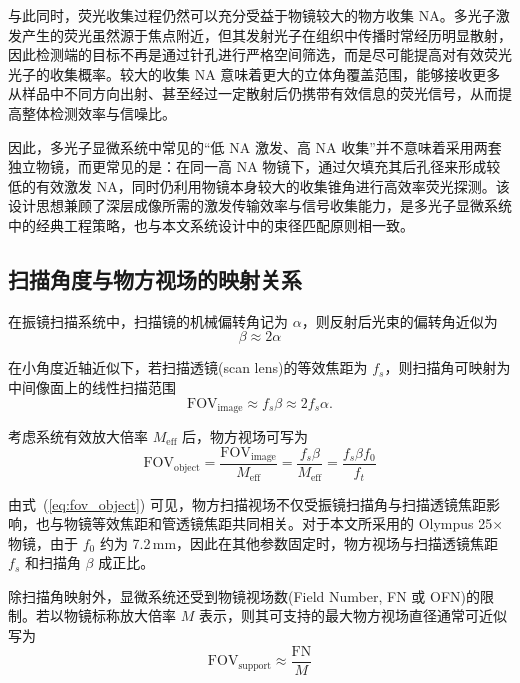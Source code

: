 与此同时，荧光收集过程仍然可以充分受益于物镜较大的物方收集 NA。多光子激发产生的荧光虽然源于焦点附近，但其发射光子在组织中传播时常经历明显散射，因此检测端的目标不再是通过针孔进行严格空间筛选，而是尽可能提高对有效荧光光子的收集概率。较大的收集 NA 意味着更大的立体角覆盖范围，能够接收更多从样品中不同方向出射、甚至经过一定散射后仍携带有效信息的荧光信号，从而提高整体检测效率与信噪比。

因此，多光子显微系统中常见的``低 NA 激发、高 NA 收集''并不意味着采用两套独立物镜，而更常见的是：在同一高 NA 物镜下，通过欠填充其后孔径来形成较低的有效激发 NA，同时仍利用物镜本身较大的收集锥角进行高效率荧光探测。该设计思想兼顾了深层成像所需的激发传输效率与信号收集能力，是多光子显微系统中的经典工程策略，也与本文系统设计中的束径匹配原则相一致。




\subsection{扫描角度与物方视场的映射关系}\label{2.4.3}

在振镜扫描系统中，扫描镜的机械偏转角记为 $\alpha$，则反射后光束的偏转角近似为
\begin{equation}
  \beta \approx 2\alpha
  \label{eq:beta_alpha}
\end{equation}

在小角度近轴近似下，若扫描透镜(scan lens)的等效焦距为 $f_s$，则扫描角可映射为中间像面上的线性扫描范围
\begin{equation}
  \mathrm{FOV}_{\mathrm{image}}\approx f_s\beta \approx 2f_s\alpha.
  \label{eq:fov_image}
\end{equation}

考虑系统有效放大倍率 $M_{\mathrm{eff}}$ 后，物方视场可写为
\begin{equation}
  \mathrm{FOV}_{\mathrm{object}}
  =\frac{\mathrm{FOV}_{\mathrm{image}}}{M_{\mathrm{eff}}}
  =\frac{f_s\beta}{M_{\mathrm{eff}}}
  =\frac{f_s\beta f_0}{f_t}
  \label{eq:fov_object}
\end{equation}

由式~(\ref{eq:fov_object}) 可见，物方扫描视场不仅受振镜扫描角与扫描透镜焦距影响，也与物镜等效焦距和管透镜焦距共同相关。对于本文所采用的 Olympus 25$\times$ 物镜，由于 $f_0$ 约为 7.2\,mm，因此在其他参数固定时，物方视场与扫描透镜焦距 $f_s$ 和扫描角 $\beta$ 成正比。

除扫描角映射外，显微系统还受到物镜视场数(Field Number, FN 或 OFN)的限制。若以物镜标称放大倍率 $M$ 表示，则其可支持的最大物方视场直径通常可近似写为
\begin{equation}
  \mathrm{FOV}_{\mathrm{support}}\approx \frac{\mathrm{FN}}{M}
  \label{eq:fov_support}
\end{equation}

